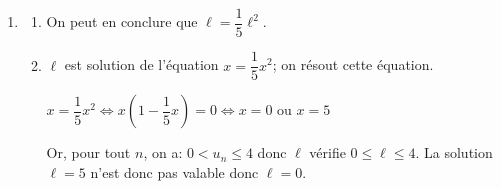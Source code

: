 \begin{enumerate}
\begin{enumerate}

On a donc démontré que pour tout entier naturel $n$, on a: $0 < u_n \leqslant 4$.

		\item 
$u_{n+1}-u_n = \dfrac{1}{5} u_n^2 - u_n = u_n \left (\dfrac{u_n}{5}-1\right )
= u_n \left (\dfrac{u_n-5}{5}\right )$		

$u_n\leqslant 4$ donc $u_n-5<0$; or $u_n>0$ donc $u_n\left (u_n-5\right )<0$ et donc $u_{n+1}-u_n<0$

On en conclut que la suite $(u_n)$ est décroissante.
		
		\item 
Pour tout $n$, $0<u_n$ donc la suite $(u_n)$ est minorée par 0.

La suite $(u_n)$ est décroissante et minorée donc, d'après le théorème de la convergence monotone, la suite $(u_n)$ est convergente.		
	\end{enumerate}
	
\item 
	\begin{enumerate}
		\item
{}		

On peut en conclure que $\ell = \dfrac{1}{5}\ell^2$.
		
		\item 
$\ell$ est solution de l'équation $x=\dfrac{1}{5}x^2$; on résout cette	équation.

$x=\dfrac{1}{5}x^2 \iff x\left (1-\dfrac{1}{5}x\right )=0
\iff x=0 \text{ ou } x=5$

Or, pour tout $n$, on a: $0<u_n\leqslant 4$ donc $\ell$ vérifie $0\leqslant \ell \leqslant 4$. La solution $\ell=5$ n'est donc pas valable donc $\ell=0$.
		

\end{enumerate}
\end{enumerate}
